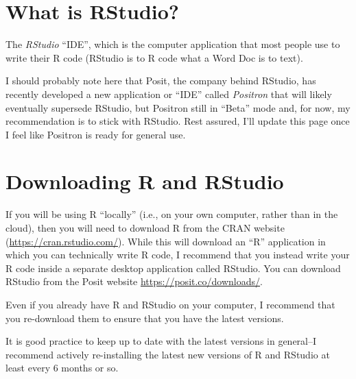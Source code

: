\documentclass[
  letterpaper,
  DIV=11,
  numbers=noendperiod]{scrreprt}
\begin{document}
\section{What is RStudio?}\label{what-is-rstudio}

The \emph{RStudio} ``IDE'', which is the computer application that most
people use to write their R code (RStudio is to R code what a Word Doc
is to text).

\begin{tcolorbox}[enhanced jigsaw, rightrule=.15mm, toptitle=1mm, title=\textcolor{quarto-callout-note-color}{\faInfo}\hspace{0.5em}{Positron}, leftrule=.75mm, bottomtitle=1mm, colbacktitle=quarto-callout-note-color!10!white, coltitle=black, titlerule=0mm, opacityback=0, colframe=quarto-callout-note-color-frame, arc=.35mm, opacitybacktitle=0.6, bottomrule=.15mm, left=2mm, breakable, toprule=.15mm, colback=white]

I should probably note here that Posit, the company behind RStudio, has
recently developed a new application or ``IDE'' called \emph{Positron}
that will likely eventually supersede RStudio, but Positron still in
``Beta'' mode and, for now, my recommendation is to stick with RStudio.
Rest assured, I'll update this page once I feel like Positron is ready
for general use.

\end{tcolorbox}

\section{Downloading R and RStudio}\label{downloading-r-and-rstudio}

If you will be using R ``locally'' (i.e., on your own computer, rather
than in the cloud), then you will need to download R from the CRAN
website (\url{https://cran.rstudio.com/}). While this will download an
``R'' application in which you can technically write R code, I recommend
that you instead write your R code inside a separate desktop application
called RStudio. You can download RStudio from the Posit website
\url{https://posit.co/downloads/}.

\begin{tcolorbox}[enhanced jigsaw, rightrule=.15mm, toptitle=1mm, title=\textcolor{quarto-callout-tip-color}{\faLightbulb}\hspace{0.5em}{Updating R and RStudio}, leftrule=.75mm, bottomtitle=1mm, colbacktitle=quarto-callout-tip-color!10!white, coltitle=black, titlerule=0mm, opacityback=0, colframe=quarto-callout-tip-color-frame, arc=.35mm, opacitybacktitle=0.6, bottomrule=.15mm, left=2mm, breakable, toprule=.15mm, colback=white]

Even if you already have R and RStudio on your computer, I recommend
that you re-download them to ensure that you have the latest versions.

It is good practice to keep up to date with the latest versions in
general--I recommend actively re-installing the latest new versions of R
and RStudio at least every 6 months or so.

\end{tcolorbox}
\end{document}
